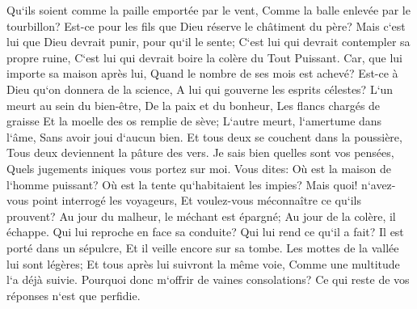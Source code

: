 \verse Qu`ils soient comme la paille emportée par le vent, Comme la balle enlevée par le tourbillon? 
\verse Est-ce pour les fils que Dieu réserve le châtiment du père? Mais c`est lui que Dieu devrait punir, pour qu`il le sente; 
\verse C`est lui qui devrait contempler sa propre ruine, C`est lui qui devrait boire la colère du Tout Puissant. 
\verse Car, que lui importe sa maison après lui, Quand le nombre de ses mois est achevé? 
\verse Est-ce à Dieu qu`on donnera de la science, A lui qui gouverne les esprits célestes? 
\verse L`un meurt au sein du bien-être, De la paix et du bonheur, 
\verse Les flancs chargés de graisse Et la moelle des os remplie de sève; 
\verse L`autre meurt, l`amertume dans l`âme, Sans avoir joui d`aucun bien. 
\verse Et tous deux se couchent dans la poussière, Tous deux deviennent la pâture des vers. 
\verse Je sais bien quelles sont vos pensées, Quels jugements iniques vous portez sur moi. 
\verse Vous dites: Où est la maison de l`homme puissant? Où est la tente qu`habitaient les impies? 
\verse Mais quoi! n`avez-vous point interrogé les voyageurs, Et voulez-vous méconnaître ce qu`ils prouvent? 
\verse Au jour du malheur, le méchant est épargné; Au jour de la colère, il échappe. 
\verse Qui lui reproche en face sa conduite? Qui lui rend ce qu`il a fait? 
\verse Il est porté dans un sépulcre, Et il veille encore sur sa tombe. 
\verse Les mottes de la vallée lui sont légères; Et tous après lui suivront la même voie, Comme une multitude l`a déjà suivie. 
\verse Pourquoi donc m`offrir de vaines consolations? Ce qui reste de vos réponses n`est que perfidie. 

